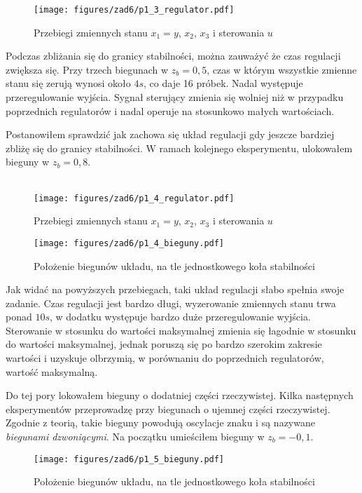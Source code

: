 \documentclass[a4paper,titlepage,11pt,floatssmall]{mwrep}
\begin{document}
\begin{figure}[H]
\centering
\texttt{[image: figures/zad6/p1\_3\_regulator.pdf]}
\caption{Przebiegi zmiennych stanu $x_1 = y$, $x_2$, $x_3$ i sterowania $u$}
\end{figure}
\newpage

Podczas zbliżania się do granicy stabilności, można zauważyć że czas regulacji zwiększa się. Przy trzech biegunach w $z_b = 0,5$, czas w którym wszystkie zmienne stanu się zerują wynosi około $4s$, co daje 16 próbek. Nadal występuje przeregulowanie wyjścia. Sygnał sterujący zmienia się wolniej niż w przypadku poprzednich regulatorów i nadal operuje na stosunkowo małych wartościach.

\indent Postanowiłem sprawdzić jak zachowa się układ regulacji gdy jeszcze bardziej zbliżę się do granicy stabilności. W ramach kolejnego eksperymentu, ulokowałem bieguny w $z_b = 0,8$.
\bigskip
\\
\\
\begin{figure}[H]
\centering
\texttt{[image: figures/zad6/p1\_4\_regulator.pdf]}
\caption{Przebiegi zmiennych stanu $x_1 = y$, $x_2$, $x_3$ i sterowania $u$}
\end{figure}
\newpage

\begin{figure}[H]
\centering
\texttt{[image: figures/zad6/p1\_4\_bieguny.pdf]}
\caption{Położenie biegunów układu, na tle jednostkowego koła stabilności}
\end{figure}

Jak widać na powyższych przebiegach, taki układ regulacji słabo spełnia swoje zadanie. Czas regulacji jest bardzo długi, wyzerowanie zmiennych stanu trwa ponad $10s$, w dodatku występuje bardzo duże przeregulowanie wyjścia. Sterowanie w stosunku do wartości maksymalnej zmienia się łagodnie w stosunku do wartości maksymalnej, jednak poruszą się po bardzo szerokim zakresie wartości i uzyskuje olbrzymią, w porównaniu do poprzednich regulatorów, wartość maksymalną.

\newpage

Do tej pory lokowałem bieguny o dodatniej części rzeczywistej. Kilka następnych eksperymentów przeprowadzę przy biegunach o ujemnej części rzeczywistej. Zgodnie z teorią, takie bieguny powodują oscylacje znaku i są nazywane \emph{biegunami dzwoniącymi}. Na początku umieściłem bieguny w $z_b = -0,1$.

\begin{figure}[H]
\centering
\texttt{[image: figures/zad6/p1\_5\_bieguny.pdf]}
\caption{Położenie biegunów układu, na tle jednostkowego koła stabilności}
\end{figure} 
\end{document}
